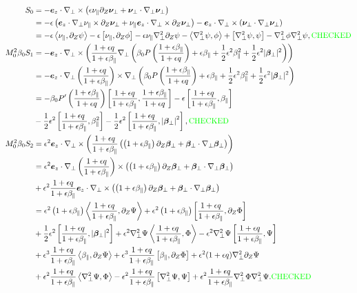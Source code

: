\documentclass{article}
\newcommand{\para}{\parallel}
\newcommand{\ep}{\epsilon}
\newcommand{\np}{\nabla_\perp}
\newcommand{\p}{\partial}
\newcommand{\fr}{\frac{1+\ep q}{1+\ep\beta_\para}}
\newcommand{\frinv}{\frac{1+\ep\beta_\para}{1+\ep q}}
\newcommand{\pth} [1] {\left( #1 \right) }
\newcommand{\br} [1] {\left[ #1 \right] }
\begin{document}
\begin{align*}
    S_0 &= -\bm{e}_z \cdot \np \times \pth{ \ep\nu_\para \p_Z \bm{\nu}_\perp + \bm{\nu}_\perp \cdot\np \bm{\nu}_\perp} \\ 
        &= -\ep\pth{\bm{e}_z \cdot \np\nu_\para \times \p_Z \bm{\nu}_\perp + \nu_\para \bm{e}_z \cdot \np \times \p_Z \bm{\nu}_\perp} -\bm{e}_z\cdot \np\times (\bm{\nu}_\perp \cdot\np \bm{\nu}_\perp) \\ 
        &= -\ep\Braket{\nu_\para, \p_Z\psi} -\ep\br{\nu_\para, \p_Z\phi} - \ep\nu_\para\np^2\p_Z\psi - \Braket{\np^2\psi, \phi} + \br{\np^2\psi, \psi} - \np^2\phi\np^2\psi, \text{\color{green}CHECKED} \\ 
    M_0^2\beta_0 S_1 &= -\bm{e}_z \cdot\np\times \pth{\fr\np \pth{\beta_0 P\pth{\frinv} + \ep \beta_\para + \frac{1}{2}\ep^2 \beta_\para^2 + \frac{1}{2}\ep^2 |\bm{\beta}_\perp|^2}} \\ 
    &= -\bm{e}_z\cdot\np\pth{\fr} \times\np \pth{\beta_0 P\pth{\frinv} + \ep \beta_\para + \frac{1}{2}\ep^2 \beta_\para^2 + \frac{1}{2}\ep^2 |\bm{\beta}_\perp|^2} \\ 
        &= -\beta_0P'\pth{\frinv}\br{\fr, \frinv} - \ep\br{\fr, \beta_\para} \\ 
        &- \frac{1}{2}\ep^2 \br{\fr, \beta_\para^2} - \frac{1}{2}\ep^2 \br{\fr, \left|\bm{\beta}_\perp\right|^2}, \text{\color{green}CHECKED} \\ 
    M_0^2\beta_0 S_2 &= \ep^2\bm{e}_z \cdot\np\times \pth{\fr \pth{\pth{1+\ep\beta_\para} \p_Z \bm{\beta}_\perp + \bm{\beta}_\perp \cdot\np \bm{\beta}_\perp}} \\ 
    &= \ep^2\bm{e}_z\cdot\np\pth{\fr} \times \pth{\pth{1+\ep\beta_\para} \p_Z \bm{\beta}_\perp + \bm{\beta}_\perp \cdot\np \bm{\beta}_\perp} \\ 
    &+ \ep^2\fr\bm{e}_z\cdot \np\times \pth{\pth{1+\ep\beta_\para} \p_Z \bm{\beta}_\perp + \bm{\beta}_\perp \cdot\np \bm{\beta}_\perp} \\ 
        &= \ep^2\pth{1+\ep\beta_\para} \Braket{\fr, \p_Z\Psi} + \ep^2\pth{1+\ep\beta_\para} \br{\fr, \p_Z\Phi} \\ 
        &+ \frac{1}{2}\ep^2\br{\fr, |\bm{\beta}_\perp|^2} + \ep^2\np^2\Psi\Braket{\fr, \Phi} - \ep^2\np^2\Psi\br{\fr, \Psi} \\ 
        &+ \ep^3\fr\Braket{\beta_\para, \p_Z\Psi} + \ep^3\fr \br{\beta_\para, \p_Z\Phi} + \ep^2 (1+\ep q) \np^2\p_Z\Psi \\ 
        &+ \ep^2\fr\Braket{\np^2\Psi, \Phi} - \ep^2\fr\br{\np^2\Psi, \Psi} + \ep^2\fr\np^2\Phi\np^2\Psi. \text{\color{green}CHECKED} 
\end{align*}
\end{document}
